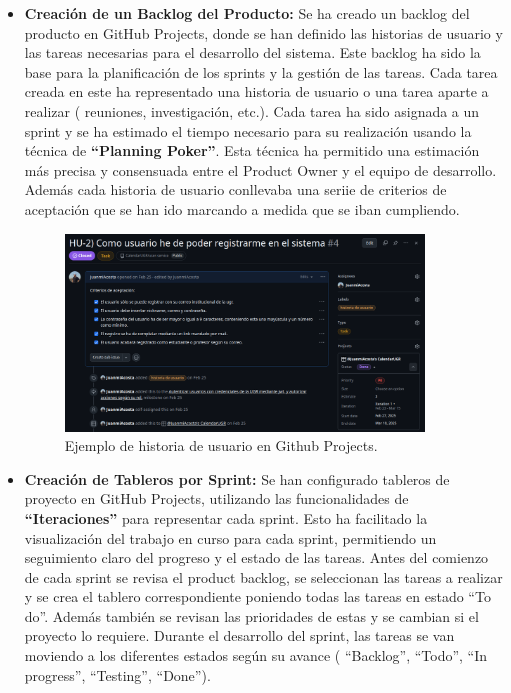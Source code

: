 \begin{itemize}
    \item \textbf{Creación de un Backlog del Producto:} Se ha creado un backlog del producto en GitHub Projects, donde se han definido las historias de usuario y las tareas necesarias para el desarrollo del sistema. Este backlog ha sido la base para la planificación de los sprints y la gestión de las tareas.
    \newline\newline
    Cada tarea creada en este ha representado una historia de usuario o una tarea aparte a realizar ( reuniones, investigación, etc.). Cada tarea ha sido asignada a un sprint y se ha estimado el tiempo necesario para su realización usando la técnica de \textbf{``Planning Poker''}. Esta técnica ha permitido una estimación más precisa y consensuada entre el Product Owner y el equipo de desarrollo.
    Además cada historia de usuario conllevaba una seriie de criterios de aceptación que se han ido marcando a medida que se iban cumpliendo. 
    
    \begin{figure}[H] 
        \centering 
        \includegraphics[width=0.9\textwidth]{figures/05_hu.png}
        \caption{Ejemplo de historia de usuario en Github Projects.} %
        \label{historia de usuario} %
    \end{figure}

    \item \textbf{Creación de Tableros por Sprint:} Se han configurado tableros de proyecto en GitHub Projects, utilizando las funcionalidades de \textbf{``Iteraciones''} para representar cada sprint. Esto ha facilitado la visualización del trabajo en curso para cada sprint, permitiendo un seguimiento claro del progreso y el estado de las tareas.
    \newline
    Antes del comienzo de cada sprint se revisa el product backlog, se seleccionan las tareas a realizar y se crea el tablero correspondiente poniendo todas las tareas en estado ``To do''. Además también se revisan las prioridades de estas y se cambian si el proyecto lo requiere.
    Durante el desarrollo del sprint, las tareas se van moviendo a los diferentes estados según su avance ( ``Backlog'', ``Todo'', ``In progress'', ``Testing'', ``Done'').
    

\end{itemize}
